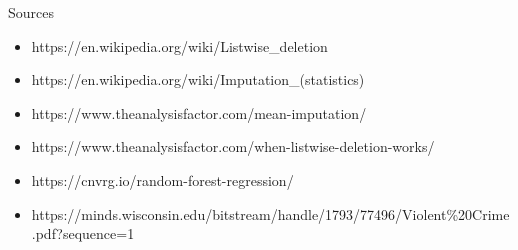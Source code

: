 \documentclass{beamer}
\begin{document}
	\begin{frame}{Sources}
		\begin{itemize}
			\item https://en.wikipedia.org/wiki/Listwise\_deletion
			\item https://en.wikipedia.org/wiki/Imputation\_(statistics)
			\item https://www.theanalysisfactor.com/mean-imputation/
			\item https://www.theanalysisfactor.com/when-listwise-deletion-works/
			\item https://cnvrg.io/random-forest-regression/
			\item https://minds.wisconsin.edu/bitstream/handle/1793/77496/Violent\%20Crime.pdf?sequence=1
		\end{itemize}
	\end{frame}
\end{document}
